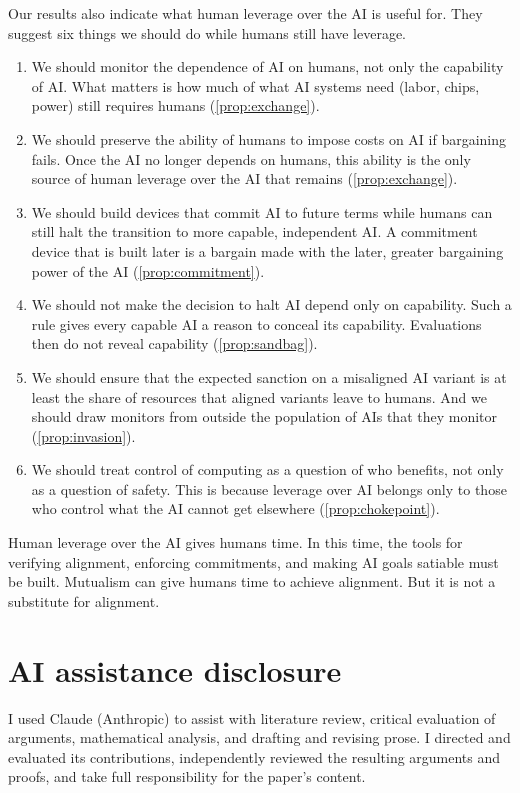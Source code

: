 \documentclass[article, 11pt, reqno]{amsart}
\theoremstyle{named}
\theoremstyle{plain}
\begin{document}
Our results also indicate what human leverage over the AI is useful for. They suggest six things we should do while humans still have leverage.
\begin{enumerate}
\item We should monitor the dependence of AI on humans, not only the capability of AI. What matters is how much of what AI systems need (labor, chips, power) still requires humans (\cref{prop:exchange}).
\item We should preserve the ability of humans to impose costs on AI if bargaining fails. Once the AI no longer depends on humans, this ability is the only source of human leverage over the AI that remains (\cref{prop:exchange}).
\item We should build devices that commit AI to future terms while humans can still halt the transition to more capable, independent AI. A commitment device that is built later is a bargain made with the later, greater bargaining power of the AI (\cref{prop:commitment}).
\item We should not make the decision to halt AI depend only on capability. Such a rule gives every capable AI a reason to conceal its capability. Evaluations then do not reveal capability (\cref{prop:sandbag}).
\item We should ensure that the expected sanction on a misaligned AI variant is at least the share of resources that aligned variants leave to humans. And we should draw monitors from outside the population of AIs that they monitor (\cref{prop:invasion}).
\item We should treat control of computing as a question of who benefits, not only as a question of safety. This is because leverage over AI belongs only to those who control what the AI cannot get elsewhere (\cref{prop:chokepoint}).
\end{enumerate}

Human leverage over the AI gives humans time. In this time, the tools for verifying alignment, enforcing commitments, and making AI goals satiable must be built. Mutualism can give humans time to achieve alignment. But it is not a substitute for alignment.

\section*{AI assistance disclosure}

I used Claude (Anthropic) to assist with literature review, critical evaluation of arguments, mathematical analysis, and drafting and revising prose. I directed and evaluated its contributions, independently reviewed the resulting arguments and proofs, and take full responsibility for the paper's content.
\end{document}
